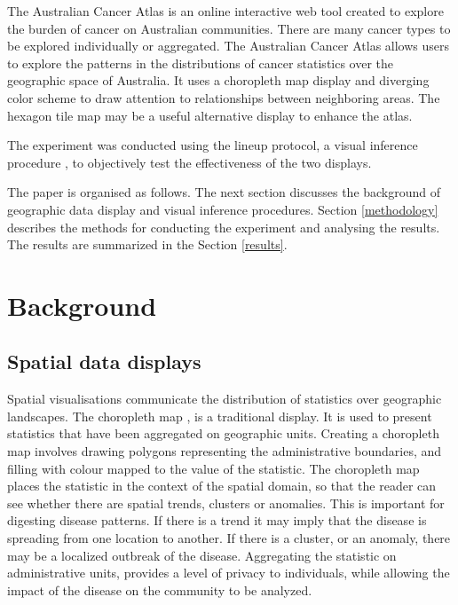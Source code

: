 \documentclass[times, doublespace]{anzsauth}
\begin{document}
The Australian Cancer Atlas \citep{atlas} is an online
interactive web tool created to explore the burden of cancer on
Australian communities. There are many cancer types to be explored
individually or aggregated. The Australian Cancer Atlas allows users to
explore the patterns in the distributions of cancer statistics over the
geographic space of Australia. It uses a choropleth map display and
diverging color scheme to draw attention to relationships between
neighboring areas. The hexagon tile map may be a useful alternative
display to enhance the atlas.

The experiment was conducted using the lineup protocol, a visual
inference procedure \citep{GIIV}, to objectively test
the effectiveness of the two displays.

The paper is organised as follows. The next section discusses the
background of geographic data display and visual inference procedures.
Section \ref{methodology} describes the methods
for conducting the experiment and analysing the results. The results are
summarized in the Section \ref{results}.

\section{Background}\label{background}

\subsection{Spatial data displays}\label{spatial-data-displays}

Spatial visualisations communicate the distribution of statistics over
geographic landscapes. The choropleth map \citep{EI},
\citep{BCM} is a traditional display. It is used to
present statistics that have been aggregated on geographic units.
Creating a choropleth map involves drawing polygons representing the
administrative boundaries, and filling with colour mapped to the value
of the statistic. The choropleth map places the statistic in the context
of the spatial domain, so that the reader can see whether there are
spatial trends, clusters or anomalies. This is important for digesting
disease patterns. If there is a trend it may imply that the disease is
spreading from one location to another. If there is a cluster, or an
anomaly, there may be a localized outbreak of the disease. Aggregating
the statistic on administrative units, provides a level of privacy to
individuals, while allowing the impact of the disease on the community
to be analyzed.
\end{document}
